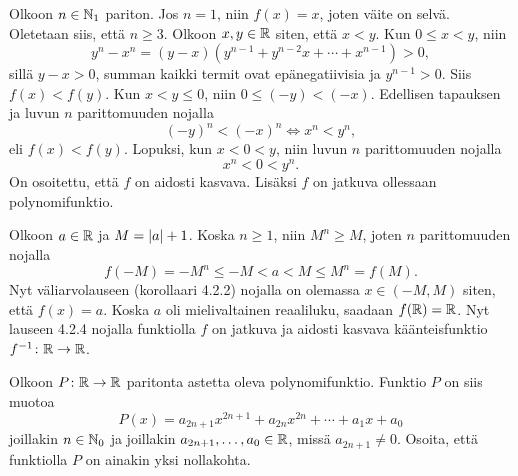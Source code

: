 \documentclass[11pt,a4paper]{amsart}
\begin{document}
\begin{solution}
  Olkoon \(n \in \mathbb{N}_1\) pariton. Jos \(n = 1\), niin \(f(x) = x\),
  joten väite on selvä. Oletetaan siis, että \(n \geq 3\).
  Olkoon \(x, y \in \mathbb{R}\) siten, että
  \(x < y\). Kun \(0 \leq x < y\), niin
  \[
    y^n - x^n = (y - x)(y^{n - 1} + y^{n - 2}x + \cdots
    + x^{n - 1}) > 0,
  \]
  sillä \(y - x > 0\), summan kaikki termit ovat epänegatiivisia ja
  \(y^{n - 1} > 0\). Siis \(f(x) < f(y)\).
  Kun \(x < y \leq 0\), niin \(0 \leq (-y) < (-x)\).
  Edellisen tapauksen ja luvun \(n\) parittomuuden nojalla
  \[
    (-y)^n < (-x)^n \iff x^n < y^n,
  \]
  eli \(f(x) < f(y)\). Lopuksi, kun \(x < 0 < y\), niin luvun \(n\)
  parittomuuden nojalla
  \[
    x^n < 0 < y^n.
  \]
  On osoitettu, että \(f\) on aidosti kasvava. Lisäksi \(f\) on jatkuva
  ollessaan polynomifunktio.

  Olkoon \(a \in \mathbb{R}\) ja \(M = \lvert a\rvert + 1\). Koska \(n \geq 1\), niin
  \(M^n \geq M\), joten \(n\) parittomuuden nojalla
  \[
    f(-M) = -M^n \leq -M < a < M \leq M^n = f(M).
  \]
  Nyt väliarvolauseen (korollaari 4.2.2) nojalla on olemassa
  \(x \in (-M, M)\) siten, että \(f(x) = a\). Koska \(a\) oli
  mielivaltainen reaaliluku, saadaan \(f(\mathbb{R}) = \mathbb{R}\).
  Nyt lauseen 4.2.4 nojalla funktiolla \(f\) on jatkuva ja aidosti kasvava
  käänteisfunktio \(f^{-1} \colon \mathbb{R} \to \mathbb{R}\).
\end{solution}

\begin{exercise}
  Olkoon \(P \colon \mathbb{R} \to \mathbb{R}\) paritonta astetta oleva polynomifunktio.
  Funktio \(P\) on siis muotoa
  \[
    P(x) = a_{2n+1}x^{2n+1} + a_{2n}x^{2n} + \cdots + a_1x + a_0
  \]
  joillakin \(n \in \mathbb{N}_0\) ja joillakin \(a_{2n+1}, \ldots, a_0 \in \mathbb{R}\),
  missä \(a_{2n+1} \ne 0\). Osoita, että funktiolla \(P\) on ainakin yksi
  nollakohta.
\end{exercise}
\end{document}

